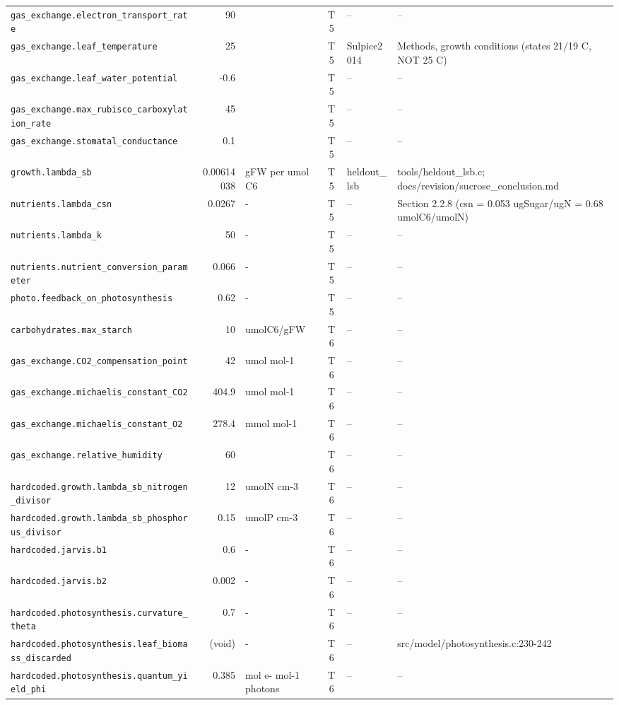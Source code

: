 \begin{table}[!htbp]
\begin{tabular}{@{}p{52mm}rp{20mm}cp{20mm}p{38mm}@{}}
\texttt{gas\_exchange.electron\_transport\_rate} & 90 &  & T5 & -- & -- \\
\texttt{gas\_exchange.leaf\_temperature} & 25 &  & T5 & Sulpice2014 & Methods, growth conditions (states 21/19 C, NOT 25 C) \\
\texttt{gas\_exchange.leaf\_water\_potential} & -0.6 &  & T5 & -- & -- \\
\texttt{gas\_exchange.max\_rubisco\_carboxylation\_rate} & 45 &  & T5 & -- & -- \\
\texttt{gas\_exchange.stomatal\_conductance} & 0.1 &  & T5 & -- & -- \\
\texttt{growth.lambda\_sb} & 0.00614038 & gFW per umol C6 & T5 & heldout\_lsb & tools/heldout\_lsb.c; docs/revision/sucrose\_conclusion.md \\
\texttt{nutrients.lambda\_csn} & 0.0267 & - & T5 & -- & Section 2.2.8 (csn = 0.053 ugSugar/ugN = 0.68 umolC6/umolN) \\
\texttt{nutrients.lambda\_k} & 50 & - & T5 & -- & -- \\
\texttt{nutrients.nutrient\_conversion\_parameter} & 0.066 & - & T5 & -- & -- \\
\texttt{photo.feedback\_on\_photosynthesis} & 0.62 & - & T5 & -- & -- \\
\texttt{carbohydrates.max\_starch} & 10 & umolC6/gFW & T6 & -- & -- \\
\texttt{gas\_exchange.CO2\_compensation\_point} & 42 & umol mol-1 & T6 & -- & -- \\
\texttt{gas\_exchange.michaelis\_constant\_CO2} & 404.9 & umol mol-1 & T6 & -- & -- \\
\texttt{gas\_exchange.michaelis\_constant\_O2} & 278.4 & mmol mol-1 & T6 & -- & -- \\
\texttt{gas\_exchange.relative\_humidity} & 60 &  & T6 & -- & -- \\
\texttt{hardcoded.growth.lambda\_sb\_nitrogen\_divisor} & 12 & umolN cm-3 & T6 & -- & -- \\
\texttt{hardcoded.growth.lambda\_sb\_phosphorus\_divisor} & 0.15 & umolP cm-3 & T6 & -- & -- \\
\texttt{hardcoded.jarvis.b1} & 0.6 & - & T6 & -- & -- \\
\texttt{hardcoded.jarvis.b2} & 0.002 & - & T6 & -- & -- \\
\texttt{hardcoded.photosynthesis.curvature\_theta} & 0.7 & - & T6 & -- & -- \\
\texttt{hardcoded.photosynthesis.leaf\_biomass\_discarded} & (void) & - & T6 & -- & src/model/photosynthesis.c:230-242 \\
\texttt{hardcoded.photosynthesis.quantum\_yield\_phi} & 0.385 & mol e- mol-1 photons & T6 & -- & -- \\
\bottomrule
\end{tabular}
\end{table}

